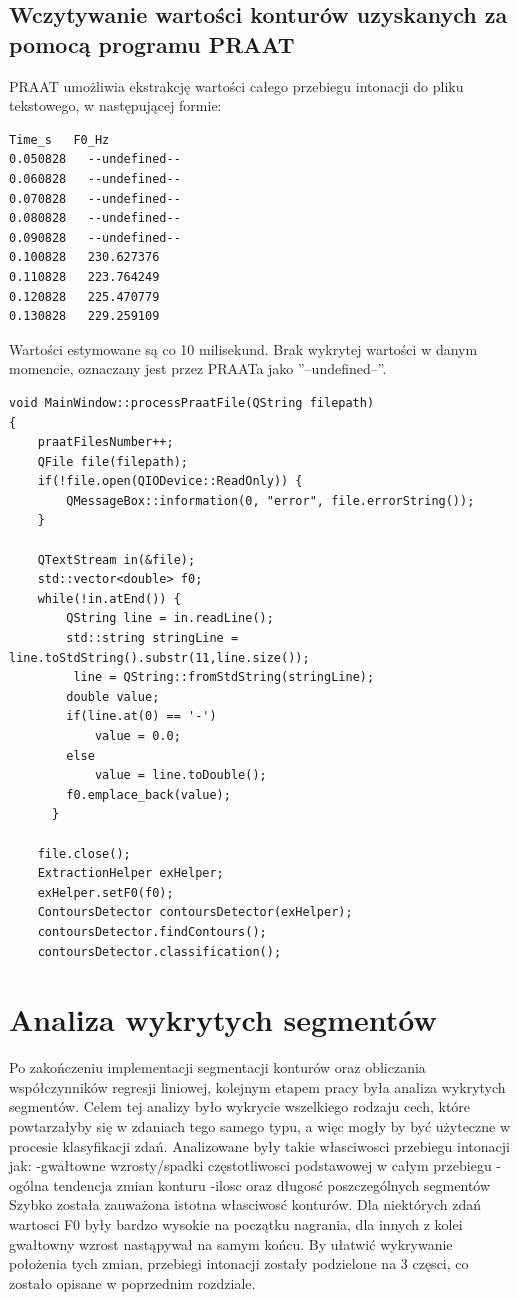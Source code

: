 \documentclass[a4paper,12 pt]{article}
\begin{document}
\subsection{Wczytywanie wartości konturów uzyskanych za pomocą programu PRAAT}
PRAAT umożliwia ekstrakcję wartości całego przebiegu intonacji do pliku tekstowego, w następującej formie:
\begin{lstlisting}
Time_s   F0_Hz
0.050828   --undefined--
0.060828   --undefined--
0.070828   --undefined--
0.080828   --undefined--
0.090828   --undefined--
0.100828   230.627376
0.110828   223.764249
0.120828   225.470779
0.130828   229.259109
\end{lstlisting}
Wartości estymowane są co 10 milisekund. Brak wykrytej wartości w danym momencie, oznaczany jest przez PRAATa jako ''--undefined--''.
\begin{lstlisting}
void MainWindow::processPraatFile(QString filepath)
{
    praatFilesNumber++;
    QFile file(filepath);
    if(!file.open(QIODevice::ReadOnly)) {
        QMessageBox::information(0, "error", file.errorString());
    }

    QTextStream in(&file);
    std::vector<double> f0;
    while(!in.atEnd()) {
        QString line = in.readLine();
        std::string stringLine = line.toStdString().substr(11,line.size());
         line = QString::fromStdString(stringLine);
        double value;
        if(line.at(0) == '-')
            value = 0.0;
        else
            value = line.toDouble();
        f0.emplace_back(value);
      }

    file.close();
    ExtractionHelper exHelper;
    exHelper.setF0(f0);
    ContoursDetector contoursDetector(exHelper);
    contoursDetector.findContours();
    contoursDetector.classification();
\end{lstlisting}
\section{Analiza wykrytych segmentów}
Po zakończeniu implementacji segmentacji konturów oraz obliczania współczynników regresji liniowej, kolejnym etapem pracy była analiza wykrytych segmentów. Celem tej analizy było wykrycie wszelkiego rodzaju cech, które powtarzałyby się w zdaniach tego samego typu, a więc mogły by być użyteczne w procesie klasyfikacji zdań. 
Analizowane były takie własciwosci przebiegu intonacji jak:
\newline-gwałtowne wzrosty/spadki częstotliwosci podstawowej w całym przebiegu 
\newline-ogólna tendencja zmian konturu
\newline-ilosc oraz długosć poszczególnych segmentów
\newline Szybko została zauważona istotna własciwosć konturów. Dla niektórych zdań wartosci F0 były bardzo wysokie na początku nagrania, dla innych z kolei gwałtowny wzrost nastąpywał na samym końcu.
By ułatwić wykrywanie położenia tych zmian, przebiegi intonacji zostały podzielone na 3 częsci, co zostało opisane w poprzednim rozdziale.
\end{document}
